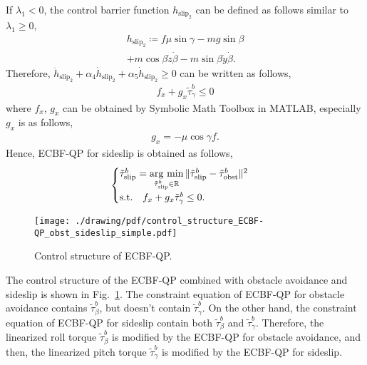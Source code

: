 If $ \lambda_1 < 0 $, the control barrier function $ h_{\mathrm{slip}_2} $ can be defined as follows similar to $ \lambda_1 \geq 0 $,
\begin{align}
    \label{eq:slip_control_barrier_function_2}
    h_{\mathrm{slip}_2} \coloneqq f \mu \sin \gamma - mg \sin \beta \\
    + m \cos \beta \dot{z} \dot{\beta} - m \sin \beta \dot{y} \dot{\beta}.  
\end{align}
Therefore, $ \ddot{h}_{\mathrm{slip}_2} + \alpha_4 \dot{h}_{\mathrm{slip}_2}  + \alpha_5 \dot{h}_{\mathrm{slip}_2} \geq 0 $ can be written as follows,
\begin{align}
    \label{eq:sideslipQP_2}
    f_x + g_x \tilde{\tau}_{\gamma}^b \leq 0
\end{align}
where $ f_x $, $ g_x $ can be obtained by Symbolic Math Toolbox in MATLAB, especially $ g_x $ is as follows,
\begin{align*}
    g_x = - \mu \cos \gamma f.
\end{align*}
Hence, ECBF-QP for sideslip is obtained as follows,
\begin{align}
    \label{eq:slipQP_final}
    \begin{cases}
        \tilde{\tau}_{\mathrm{slip}}^b = \mathop{\rm arg~min}\limits_{\tilde{\tau}_{\mathrm{slip}}^b \in \mathbb{R}} \| \tilde{\tau}_{\mathrm{slip}}^b - \tilde{\tau}_{\mathrm{obst}}^b \| ^2 \\
        \mathrm{s.t.} \quad f_x + g_x \tilde{\tau}_{\gamma}^b \leq 0.
        \end{cases}
\end{align}
\begin{figure}[t]
    \centering
    \texttt{[image: ./drawing/pdf/control\_structure\_ECBF-QP\_obst\_sideslip\_simple.pdf]}
    \caption{Control structure of ECBF-QP.}
    \label{fig:control_structure_of_ECBF-QP}
\end{figure}
The control structure of the ECBF-QP combined with obstacle avoidance and sideslip is shown in Fig.~\ref{fig:control_structure_of_ECBF-QP}.
The constraint equation of ECBF-QP for obstacle avoidance contains $ \tilde{\tau}_{\beta}^b $, but doesn't contain $ \tilde{\tau}_{\gamma}^b $.
On the other hand, the constraint equation of ECBF-QP for sideslip contain both $ \tilde{\tau}_{\beta}^b $ and $ \tilde{\tau}_{\gamma}^b $.
Therefore, the linearized roll torque $ \tilde{\tau}_{\beta}^b $ is modified by the ECBF-QP for obstacle avoidance, and then, the linearized pitch torque $ \tilde{\tau}_{\gamma}^b $ is modified by the ECBF-QP for sideslip.